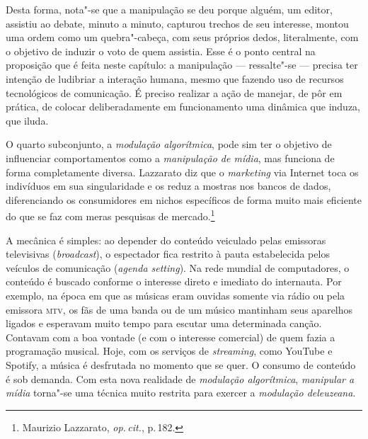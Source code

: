 Desta forma, nota"-se que a manipulação se deu porque alguém, um editor,
assistiu ao debate, minuto a minuto, capturou trechos de seu interesse,
montou uma ordem como um quebra"-cabeça, com seus próprios dedos,
literalmente, com o objetivo de induzir o voto de quem assistia. Esse é
o ponto central na proposição que é feita neste capítulo: a manipulação
--- ressalte"-se --- precisa ter intenção de ludibriar a interação humana,
mesmo que fazendo uso de recursos tecnológicos de comunicação. É preciso
realizar a ação de manejar, de pôr em prática, de colocar
deliberadamente em funcionamento uma dinâmica que induza, que iluda.

O quarto subconjunto, a \emph{modulação algorítmica}, pode sim ter o
objetivo de influenciar comportamentos como a \emph{manipulação de
mídia}, mas funciona de forma completamente diversa. Lazzarato diz que o
\emph{marketing} via Internet toca os indivíduos em sua singularidade e
os reduz a mostras nos bancos de dados, diferenciando os consumidores em
nichos específicos de forma muito mais eficiente do que se faz com meras
pesquisas de mercado.\footnote{Maurizio Lazzarato, \textit{op.\,cit.}, p.\,182.}

A mecânica é simples: ao depender do conteúdo veiculado pelas emissoras
televisivas (\emph{broadcast}), o espectador fica restrito à pauta
estabelecida pelos veículos de comunicação (\emph{agenda setting}). Na
rede mundial de computadores, o conteúdo é buscado conforme o interesse
direto e imediato do internauta. Por exemplo, na época em que as músicas
eram ouvidas somente via rádio ou pela emissora \textsc{mtv}, os fãs de uma banda
ou de um músico mantinham seus aparelhos ligados e esperavam muito tempo
para escutar uma determinada canção. Contavam com a boa vontade (e com o
interesse comercial) de quem fazia a programação musical. Hoje, com os
serviços de \emph{streaming}, como YouTube e Spotify, a música é
desfrutada no momento que se quer. O consumo de conteúdo é sob demanda.
Com esta nova realidade de \emph{modulação algorítmica}, \emph{manipular
a mídia} torna"-se uma técnica muito restrita para exercer a
\emph{modulação deleuzeana}.

